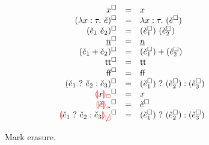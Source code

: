 \begin{figure}[htbp]
  \newcommand{\erasesToRow}[2]{\erase{#1} & = & #2}
  \[\begin{array}{rcl}
    \erasesToRow{x}{x} \\
    \erasesToRow{(\ECLam{x}{\TMV}{\ECMV})}{\ELam{x}{\TMV}{(\erase{\ECMV})}} \\
    \erasesToRow{(\ECAp{\ECMV_1}{\ECMV_2})}{\EAp{(\erase{\ECMV_1})}{(\erase{\ECMV_2})}} \\
    \erasesToRow{\ECNumMV}{\ENumMV} \\
    \erasesToRow{(\ECPlus{\ECMV_1}{\ECMV_2})}{\EPlus{(\erase{\ECMV_1})}{(\erase{\ECMV_2})}} \\
    \erasesToRow{\ECTrue}{\ETrue} \\
    \erasesToRow{\ECFalse}{\EFalse} \\
    \erasesToRow{(\ECIf{\ECMV_1}{\ECMV_2}{\ECMV_3})}{\EIf{(\erase{\ECMV_1})}{(\erase{\ECMV_2})}{(\erase{\ECMV_3})}} \\
    \erasesToRow{\ECUnbound{x}}{x} \\
    \erasesToRow{\ECInconType{\ECMV}}{\erase{\ECMV}} \\
    \erasesToRow{\ECInconBr{\ECMV_1}{\ECMV_2}{\ECMV_3}}{\EIf{(\erase{\ECMV_1})}{(\erase{\ECMV_2})}{(\erase{\ECMV_3})}} \\
  \end{array}\]
  \caption{Mark erasure.}
  \label{fig:calculus-mark-erasure}
\end{figure}
